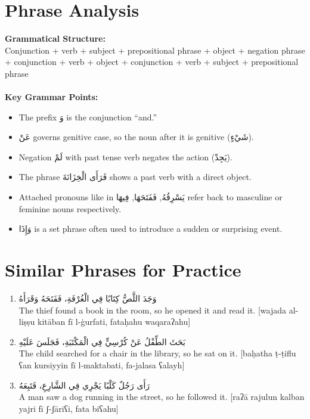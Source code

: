\documentclass[a4paper,12pt]{article}
\begin{document}
\section{Phrase Analysis}

\begin{tcolorbox}[colback=boxcolor,colframe=headercolor]
\textbf{Grammatical Structure:}\\
Conjunction + verb + subject + prepositional phrase + object + negation phrase + conjunction + verb + object + conjunction + verb + subject + prepositional phrase \\
\\
\textbf{Key Grammar Points:}
\begin{itemize}
\item The prefix \textarabic{وَ} is the conjunction “and.”
\item \textarabic{عَنْ} governs genitive case, so the noun after it is genitive (\textarabic{شَيْءٍ}).
\item Negation \textarabic{لَمْ} with past tense verb negates the action (\textarabic{يَجِدْ}).
\item The phrase \textarabic{فَرَأَى الْخِزَانَةَ} shows a past verb with a direct object.
\item Attached pronouns like in \textarabic{يَسْرِقُهُ}, \textarabic{فَفَتَحَهَا}, \textarabic{فِيهَا} refer back to masculine or feminine nouns respectively.
\item \textarabic{وَإِذَا} is a set phrase often used to introduce a sudden or surprising event.
\end{itemize}
\end{tcolorbox}

\section{Similar Phrases for Practice}

\begin{enumerate}
\item \textarabic{وَجَدَ اللَّصُّ كِتَابًا فِي الْغُرْفَةِ، فَفَتَحَهُ وَقَرَأَهُ}\\
The thief found a book in the room, so he opened it and read it. [wajada al-liṣṣu kitāban fī l-ġurfati, fataḥahu waqaraʔahu]

\item \textarabic{بَحَثَ الطِّفْلُ عَنْ كُرْسِيٍّ فِي الْمَكْتَبَةِ، فَجَلَسَ عَلَيْهِ}\\
The child searched for a chair in the library, so he sat on it. [baḥatha ṭ-ṭiflu ʕan kursiyyin fī l-maktabati, fa-jalasa ʕalayh]

\item \textarabic{رَأَى رَجُلٌ كَلْبًا يَجْرِي فِي الشَّارِعِ، فَتَبِعَهُ}\\
A man saw a dog running in the street, so he followed it. [raʔā rajulun kalban yajri fī ʃ-ʃāriʕi, fata biʕahu]
\end{enumerate}
\end{document}
